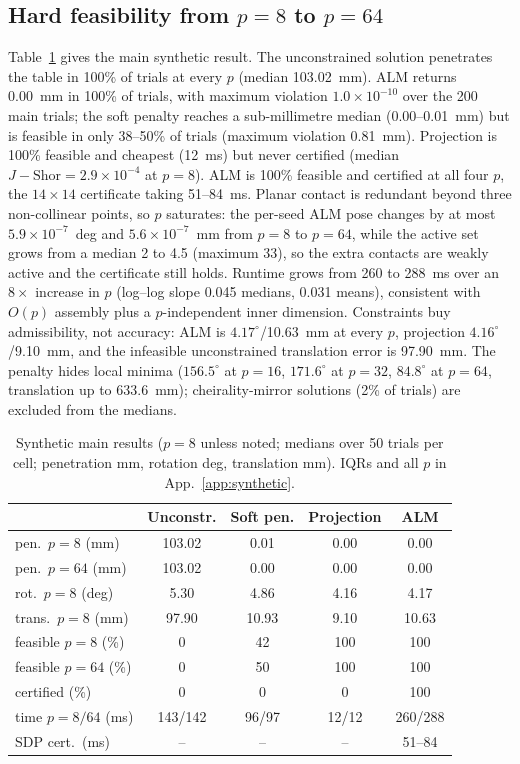 \subsection{Hard feasibility from $p=8$ to $p=64$}\label{sec:synthetic}
Table~\ref{tab:synthetic} gives the main synthetic result. The unconstrained solution penetrates the table in 100\% of trials at every $p$ (median 103.02~mm). ALM returns 0.00~mm in 100\% of trials, with maximum violation $1.0\times10^{-10}$ over the 200 main trials; the soft penalty reaches a sub-millimetre median (0.00--0.01~mm) but is feasible in only 38--50\% of trials (maximum violation 0.81~mm). Projection is 100\% feasible and cheapest (12~ms) but never certified (median $J-\mathrm{Shor}=2.9\times10^{-4}$ at $p=8$). ALM is 100\% feasible and certified at all four $p$, the $14\times14$ certificate taking 51--84~ms. Planar contact is redundant beyond three non-collinear points, so $p$ saturates: the per-seed ALM pose changes by at most $5.9\times10^{-7}$~deg and $5.6\times10^{-7}$~mm from $p=8$ to $p=64$, while the active set grows from a median 2 to 4.5 (maximum 33), so the extra contacts are weakly active and the certificate still holds. Runtime grows from 260 to 288~ms over an $8\times$ increase in $p$ (log--log slope 0.045 medians, 0.031 means), consistent with $O(p)$ assembly plus a $p$-independent inner dimension. Constraints buy admissibility, not accuracy: ALM is $4.17^\circ$/10.63~mm at every $p$, projection $4.16^\circ$/9.10~mm, and the infeasible unconstrained translation error is 97.90~mm. The penalty hides local minima ($156.5^\circ$ at $p=16$, $171.6^\circ$ at $p=32$, $84.8^\circ$ at $p=64$, translation up to 633.6~mm); cheirality-mirror solutions (2\% of trials) are excluded from the medians.

\begin{table}[t]
\centering
\caption{Synthetic main results ($p=8$ unless noted; medians over 50 trials per cell; penetration mm, rotation deg, translation mm). IQRs and all $p$ in App.~\ref{app:synthetic}.}
\label{tab:synthetic}
\scriptsize
\setlength{\tabcolsep}{3pt}
\begin{tabular}{@{}lcccc@{}}
\toprule
 & Unconstr. & Soft pen. & Projection & \textbf{ALM} \\
\midrule
pen.\ $p{=}8$ (mm) & 103.02 & 0.01 & 0.00 & 0.00 \\
pen.\ $p{=}64$ (mm) & 103.02 & 0.00 & 0.00 & 0.00 \\
rot.\ $p{=}8$ (deg) & 5.30 & 4.86 & 4.16 & 4.17 \\
trans.\ $p{=}8$ (mm) & 97.90 & 10.93 & 9.10 & 10.63 \\
feasible $p{=}8$ (\%) & 0 & 42 & 100 & 100 \\
feasible $p{=}64$ (\%) & 0 & 50 & 100 & 100 \\
certified (\%) & 0 & 0 & 0 & 100 \\
time $p{=}8/64$ (ms) & 143/142 & 96/97 & 12/12 & 260/288 \\
SDP cert.\ (ms) & -- & -- & -- & 51--84 \\
\bottomrule
\end{tabular}
\end{table}

